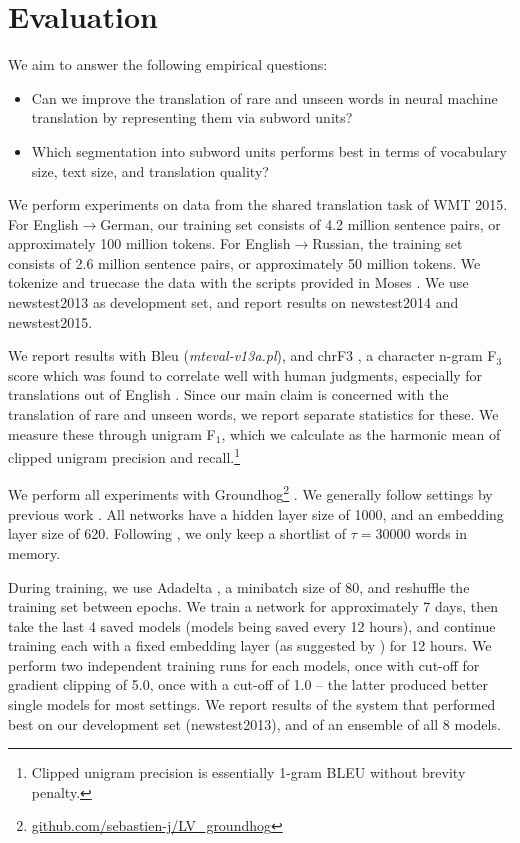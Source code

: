 \documentclass[11pt]{article}
\begin{document}
\section{Evaluation}
\label{sec-eval}

We aim to answer the following empirical questions:

\begin{itemize}
\setlength{\itemsep}{0pt}
\item Can we improve the translation of rare and unseen words in neural machine translation by representing them via subword units?
\item Which segmentation into subword units performs best in terms of vocabulary size, text size, and translation quality?
\end{itemize}

We perform experiments on data from the shared translation task of WMT 2015.
For English$\to$German, our training set consists of 4.2 million sentence pairs, or approximately 100 million tokens.
For English$\to$Russian, the training set consists of 2.6 million sentence pairs, or approximately 50 million tokens.
We tokenize and truecase the data with the scripts provided in Moses \cite{koehnmoses}.
We use newstest2013 as development set, and report results on newstest2014 and newstest2015.

We report results with {\sc Bleu} (\emph{mteval-v13a.pl}),
and {\sc chrF3} \cite{popovic:2015:WMT}, a character n-gram F$_3$ score which was found to correlate well with human judgments, especially for translations out of English \cite{stanojevic-EtAl:2015:WMT}. %
Since our main claim is concerned with the translation of rare and unseen words, we report separate statistics for these.
We measure these through unigram F$_1$, which we calculate as the harmonic mean of clipped unigram precision and recall.\footnote{Clipped unigram precision is essentially 1-gram BLEU without brevity penalty.}

We perform all experiments with Groundhog\footnote{\url{github.com/sebastien-j/LV_groundhog}} \cite{DBLP:journals/corr/BahdanauCB14}.
We generally follow settings by previous work \cite{DBLP:journals/corr/BahdanauCB14,jean15}.
All networks have a hidden layer size of 1000, and an embedding layer size of 620.
Following , we only keep a shortlist of $\tau=30000$ words in memory.

During training, we use Adadelta \cite{DBLP:journals/corr/abs-1212-5701}, a minibatch size of 80, and reshuffle the training set between epochs.
We train a network for approximately 7 days, then take the last 4 saved models (models being saved every 12 hours), and continue training each with a fixed embedding layer (as suggested by \cite{jean15}) for 12 hours.
We perform two independent training runs for each models, once with cut-off for gradient clipping \cite{DBLP:conf/icml/PascanuMB13} of 5.0, once with a cut-off of 1.0 -- the latter produced better single models for most settings.
We report results of the system that performed best on our development set (newstest2013), and of an ensemble of all 8 models.
\end{document}
